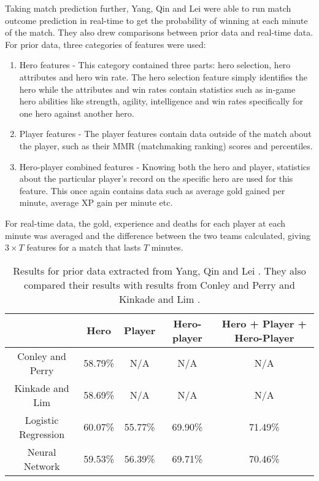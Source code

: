 \documentclass[Report.tex]{subfiles}
\begin{document}
Taking match prediction further, Yang, Qin and Lei \cite{dota-yang} were able to run match outcome prediction in real-time to get the probability of winning at each minute of the match. They also drew comparisons between prior data and real-time data. For prior data, three categories of features were used:
\begin{enumerate}
\item Hero features - This category contained three parts: hero selection, hero attributes and hero win rate. The hero selection feature simply identifies the hero while the attributes and win rates contain statistics such as in-game hero abilities like strength, agility, intelligence and win rates specifically for one hero against another hero.
\item Player features - The player features contain data outside of the match about the player, such as their MMR (matchmaking ranking) scores and percentiles.
\item Hero-player combined features - Knowing both the hero and player, statistics about the particular player's record on the specific hero are used for this feature. This once again contains data such as average gold gained per minute, average XP gain per minute etc. 
\end{enumerate}
For real-time data, the gold, experience and deaths for each player at each minute was averaged and the difference between the two teams calculated, giving $3 \times T$ features for a match that lasts $T$ minutes. 
\begin{table}[H]
\centering
\begin{tabular}{| c | c | c | c | c |}
\hline
 & \textbf{Hero} & \textbf{Player} & \textbf{Hero-player} & \textbf{Hero + Player + Hero-Player} \\ \hline
 Conley and Perry \cite{dota-conley} & 58.79\% & N/A & N/A & N/A \\ \hline
 Kinkade and Lim \cite{dota-kinkade} & 58.69\% & N/A & N/A & N/A \\ \hline
 Logistic Regression & 60.07\% & 55.77\% & 69.90\% & 71.49\% \\ \hline
 Neural Network & 59.53\% & 56.39\% & 69.71\% & 70.46\% \\ \hline
\end{tabular}
\caption{Results for prior data extracted from Yang, Qin and Lei \cite{dota-yang}. They also compared their results with results from Conley and Perry \cite{dota-conley} and Kinkade and Lim \cite{dota-kinkade}.}
\end{table}
\end{document}
